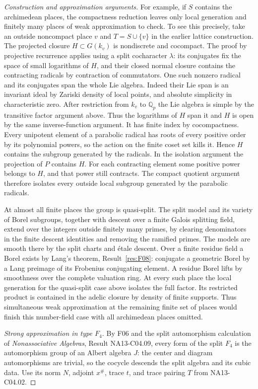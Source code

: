 \documentclass[11pt,a4paper,openany,oneside]{book}
\theoremstyle{resultstyle}
\theoremstyle{definition}
\numberwithin{equation}{chapter}
\begin{document}
\begin{proof}[Construction and approximation arguments]
For example, if \(S\) contains the archimedean
places, the compactness reduction leaves only
local generation and finitely many places of
weak approximation to check. To see this
precisely, take an outside noncompact place
\(v\) and \(T=S\cup\{v\}\) in the earlier
lattice construction. The projected closure
\(H\subset G(k_v)\) is nondiscrete and
cocompact. The proof by projective recurrence
applies using a split cocharacter \(\lambda\):
its conjugates fix the space of small
logarithms of \(H\), and their closed
normal closure contains the contracting
radicals by contraction of commutators.
One such nonzero radical and its conjugates
span the whole Lie algebra. Indeed their
Lie span is an invariant ideal by Zariski
density of local points, and absolute
simplicity in characteristic zero. After
restriction from \(k_v\) to \(\mathbb Q_p\)
the Lie algebra is simple by the transitive
factor argument above. Thus the logarithms
of \(H\) span it and \(H\) is open by the
same inverse-function argument. It has
finite index by cocompactness. Every
unipotent element of a parabolic radical
has roots of every positive order by its
polynomial powers, so the action on the
finite coset set kills it. Hence \(H\)
contains the subgroup generated by the
radicals. In the isolation argument the
projection of \(P\) contains \(H\).
For each contracting element some positive
power belongs to \(H\), and that power
still contracts. The compact quotient
argument therefore isolates every
outside local subgroup generated by
the parabolic radicals.

At almost all finite places the group is
quasi-split. The split model and its variety
of Borel subgroups, together with descent
over a finite Galois splitting field,
extend over the integers outside finitely
many primes, by clearing denominators in
the finite descent identities and removing
the ramified primes. The models are smooth
there by the split charts and \'{e}tale
descent. Over a finite residue field a
Borel exists by Lang's theorem,
Result~\ref{res:F08}: conjugate a geometric
Borel by a Lang preimage of its Frobenius
conjugating element. A residue Borel
lifts by smoothness over the complete
valuation ring. At every such place
the local generation for the quasi-split
case above isolates the full factor.
Its restricted product is contained in
the adelic closure by density of finite
supports. Thus simultaneous weak
approximation at the remaining finite
set of places would finish this
number-field case with all archimedean
places omitted.

\medskip\noindent
\textit{Strong approximation in type \(F_4\).}
By F06 and the split automorphism calculation of
\emph{Nonassociative Algebras}, Result NA13-C04.09,
every form of the split \(F_4\) is the automorphism
group of an Albert algebra \(J\): the center and
diagram automorphisms are trivial, so the cocycle
descends the split algebra and its cubic data.
Use its norm \(N\), adjoint \(x^\#\), trace \(t\),
and trace pairing \(T\) from NA13-C04.02.


\end{proof}
\end{document}
